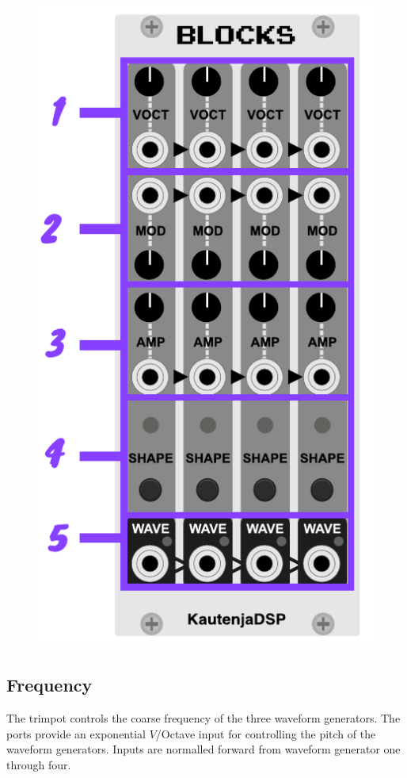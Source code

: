 \documentclass[12pt,letter]{article}
\begin{document}
\begin{figure}[!htp]
\centering
\includegraphics{img/Interface}
\end{figure}

\subsection{Frequency}

The trimpot controls the coarse frequency of the three waveform generators. The ports provide an exponential $V$/Octave input for controlling the pitch of the waveform generators. Inputs are normalled forward from waveform generator one through four.
\end{document}
